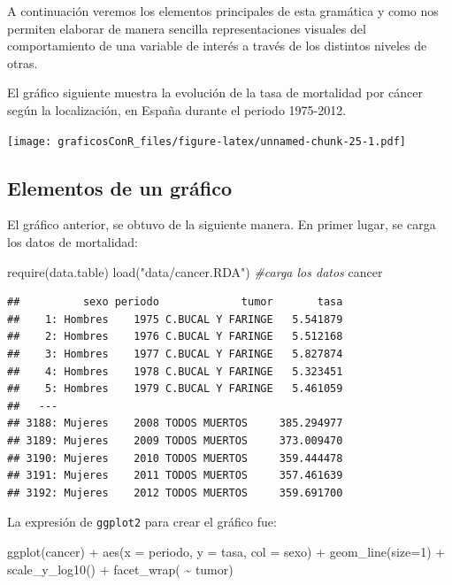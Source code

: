 \documentclass[
]{article}
\newenvironment{Shaded}{\begin{snugshade}}{\end{snugshade}}
\newcommand{\AttributeTok}[1]{\textcolor[rgb]{0.77,0.63,0.00}{#1}}
\newcommand{\CommentTok}[1]{\textcolor[rgb]{0.56,0.35,0.01}{\textit{#1}}}
\newcommand{\DecValTok}[1]{\textcolor[rgb]{0.00,0.00,0.81}{#1}}
\newcommand{\FunctionTok}[1]{\textcolor[rgb]{0.00,0.00,0.00}{#1}}
\newcommand{\NormalTok}[1]{#1}
\newcommand{\SpecialCharTok}[1]{\textcolor[rgb]{0.00,0.00,0.00}{#1}}
\newcommand{\StringTok}[1]{\textcolor[rgb]{0.31,0.60,0.02}{#1}}
\numberwithin{ejcnt}{section}
\begin{document}
A continuación veremos los elementos principales de esta gramática y como nos permiten elaborar de manera sencilla representaciones visuales del comportamiento de una variable de interés a través de los distintos niveles de otras.

El gráfico siguiente muestra la evolución de la tasa de mortalidad por cáncer según la localización, en España durante el periodo 1975-2012.

\texttt{[image: graficosConR\_files/figure-latex/unnamed-chunk-25-1.pdf]}

\hypertarget{elementos-de-un-gruxe1fico}{%
\subsection{Elementos de un gráfico}\label{elementos-de-un-gruxe1fico}}

El gráfico anterior, se obtuvo de la siguiente manera. En primer lugar, se carga los datos de mortalidad:

\begin{Shaded}
\begin{Highlighting}[]
\FunctionTok{require}\NormalTok{(data.table)}
\FunctionTok{load}\NormalTok{(}\StringTok{"data/cancer.RDA"}\NormalTok{) }\CommentTok{\#carga los datos}
\NormalTok{cancer}
\end{Highlighting}
\end{Shaded}

\begin{verbatim}
##          sexo periodo             tumor       tasa
##    1: Hombres    1975 C.BUCAL Y FARINGE   5.541879
##    2: Hombres    1976 C.BUCAL Y FARINGE   5.512168
##    3: Hombres    1977 C.BUCAL Y FARINGE   5.827874
##    4: Hombres    1978 C.BUCAL Y FARINGE   5.323451
##    5: Hombres    1979 C.BUCAL Y FARINGE   5.461059
##   ---                                             
## 3188: Mujeres    2008 TODOS MUERTOS     385.294977
## 3189: Mujeres    2009 TODOS MUERTOS     373.009470
## 3190: Mujeres    2010 TODOS MUERTOS     359.444478
## 3191: Mujeres    2011 TODOS MUERTOS     357.461639
## 3192: Mujeres    2012 TODOS MUERTOS     359.691700
\end{verbatim}

La expresión de \texttt{ggplot2} para crear el gráfico fue:

\begin{Shaded}
\begin{Highlighting}[]
\FunctionTok{ggplot}\NormalTok{(cancer) }\SpecialCharTok{+}
  \FunctionTok{aes}\NormalTok{(}\AttributeTok{x =}\NormalTok{ periodo, }\AttributeTok{y =}\NormalTok{ tasa, }\AttributeTok{col =}\NormalTok{ sexo) }\SpecialCharTok{+}
  \FunctionTok{geom\_line}\NormalTok{(}\AttributeTok{size=}\DecValTok{1}\NormalTok{) }\SpecialCharTok{+} \FunctionTok{scale\_y\_log10}\NormalTok{() }\SpecialCharTok{+}
  \FunctionTok{facet\_wrap}\NormalTok{( }\SpecialCharTok{\textasciitilde{}}\NormalTok{ tumor) }
\end{Highlighting}
\end{Shaded}
\end{document}
